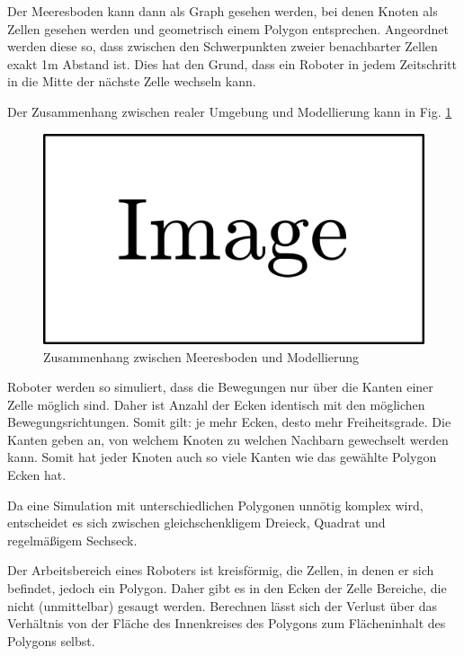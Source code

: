 \documentclass{article}
\begin{document}
Der Meeresboden kann dann als Graph gesehen werden, bei denen Knoten 
als Zellen gesehen werden und geometrisch einem Polygon entsprechen. 
Angeordnet werden diese so, dass zwischen den Schwerpunkten zweier 
benachbarter Zellen exakt 1m Abstand ist. Dies hat den Grund, dass 
ein Roboter in jedem Zeitschritt in die Mitte der nächste Zelle wechseln kann.

Der Zusammenhang zwischen realer Umgebung und Modellierung kann in
Fig. \ref{img:floor_grap_polygons} 

\begin{figure}
\includegraphics{img/dummy.png}
\caption{Zusammenhang zwischen Meeresboden und Modellierung}
\label{img:floor_grap_polygons}
\end{figure}

Roboter werden so simuliert, dass die Bewegungen nur über die Kanten einer
Zelle möglich sind. Daher ist Anzahl der Ecken identisch mit den möglichen
Bewegungsrichtungen. Somit gilt: je mehr Ecken, desto mehr Freiheitsgrade.
Die Kanten geben an, von welchem Knoten zu welchen Nachbarn gewechselt werden
kann. Somit hat jeder Knoten auch so viele Kanten wie das gewählte Polygon
Ecken hat.

Da eine Simulation mit unterschiedlichen Polygonen unnötig komplex
wird, entscheidet es sich zwischen gleichschenkligem Dreieck, 
Quadrat und regelmäßigem Sechseck.

Der Arbeitsbereich eines Roboters ist kreisförmig, die Zellen, in denen er
sich befindet, jedoch ein Polygon. Daher gibt es in den Ecken der Zelle 
Bereiche, die nicht (unmittelbar) gesaugt werden. Berechnen lässt 
sich der Verlust über das Verhältnis von der Fläche des Innenkreises 
des Polygons zum Flächeninhalt des Polygons selbst. 
\end{document}
